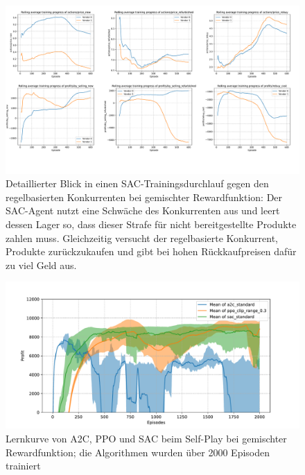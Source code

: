 \begin{figure}[htb]
	\centering
	\includegraphics[width=\textwidth]{appendix/explanation_unnormal_sac.pdf}
	\caption{
		Detaillierter Blick in einen SAC-Trainingsdurchlauf gegen den regelbasierten Konkurrenten bei gemischter Rewardfunktion:
		Der SAC-Agent nutzt eine Schwäche des Konkurrenten aus und leert dessen Lager so, dass dieser Strafe für nicht bereitgestellte Produkte zahlen muss.
		Gleichzeitig versucht der regelbasierte Konkurrent, Produkte zurückzukaufen und gibt bei hohen Rückkaufpreisen dafür zu viel Geld aus.
	}
	\label{graphic:ExplanationUnnormalSAC}
\end{figure}
\begin{figure}[htb]
	\centering
	\includegraphics[width=\textwidth]{appendix/self_play_mixed.pdf}
	\caption{Lernkurve von A2C, PPO und SAC beim Self-Play bei gemischter Rewardfunktion; die Algorithmen wurden über 2000 Episoden trainiert}
	\label{graphic:SelfPlayMixedLearningCurve}
\end{figure}
